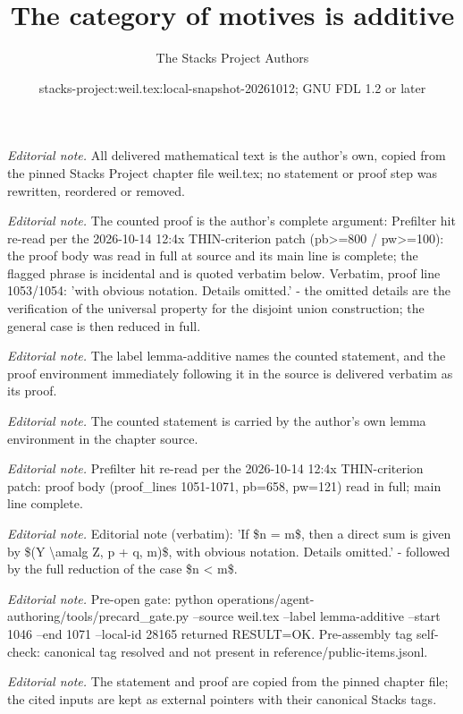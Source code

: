 \documentclass[10pt,a4paper]{amsart}
\title{The category of motives is additive}
\author{The Stacks Project Authors}
\date{stacks-project:weil.tex:local-snapshot-20261012; GNU FDL 1.2 or later}
\theoremstyle{plain}
\theoremstyle{definition}
\theoremstyle{remark}
\numberwithin{equation}{subsection}
\begin{document}
\maketitle
\noindent\textit{Editorial note.} All delivered mathematical text is the author's own, copied from the pinned Stacks Project chapter file weil.tex; no statement or proof step was rewritten, reordered or removed.\par\medskip
\noindent\textit{Editorial note.} The counted proof is the author's complete argument: Prefilter hit re-read per the 2026-10-14 12:4x THIN-criterion patch (pb>=800 / pw>=100): the proof body was read in full at source and its main line is complete; the flagged phrase is incidental and is quoted verbatim below. Verbatim, proof line 1053/1054: 'with obvious notation. Details omitted.'  -  the omitted details are the verification of the universal property for the disjoint union construction; the general case is then reduced in full.\par\medskip
\noindent\textit{Editorial note.} The label lemma-additive names the counted statement, and the proof environment immediately following it in the source is delivered verbatim as its proof.\par\medskip
\noindent\textit{Editorial note.} The counted statement is carried by the author's own lemma environment in the chapter source.\par\medskip
\noindent\textit{Editorial note.} Prefilter hit re-read per the 2026-10-14 12:4x THIN-criterion patch: proof body (proof\_lines 1051-1071, pb=658, pw=121) read in full; main line complete.\par\medskip
\noindent\textit{Editorial note.} Editorial note (verbatim): 'If \$n = m\$, then a direct sum is given by \$(Y \textbackslash{}amalg Z, p + q, m)\$, with obvious notation. Details omitted.'  -  followed by the full reduction of the case \$n < m\$.\par\medskip
\noindent\textit{Editorial note.} Pre-open gate: python operations/agent-authoring/tools/precard\_gate.py --source weil.tex --label lemma-additive --start 1046 --end 1071 --local-id 28165 returned RESULT=OK. Pre-assembly tag self-check: canonical tag resolved and not present in reference/public-items.jsonl.\par\medskip
\noindent\textit{Editorial note.} The statement and proof are copied from the pinned chapter file; the cited inputs are kept as external pointers with their canonical Stacks tags.\par\medskip
\end{document}
